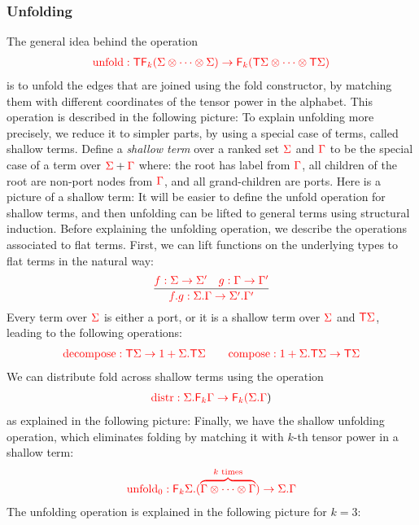 \subsubsection{Unfolding}
The general idea behind the  operation 
\begin{align*}
    {\color{red}{{\color{red}{\mathrm{unfold}}}: {\color{red}{\mathsf T}}{\color{red}{\mathsf F_{k}}}(\Sigma \otimes \cdots \otimes \Sigma) \to {\color{red}{\mathsf F_{k}}}( {\color{red}{\mathsf T}}{\color{red}{\Sigma}}\otimes \cdots \otimes {\color{red}{\mathsf T}}{\color{red}{\Sigma}})}} 
\end{align*}
is to unfold the edges that are joined using the fold constructor, by matching them with different coordinates of the tensor power in the alphabet. This operation is described in the following picture:
To explain unfolding more precisely, we reduce it to simpler parts, by using a special case of terms, called shallow terms. Define a \emph{shallow term} over a ranked set ${\color{red}{\Sigma}}$ and ${\color{red}{\Gamma}}$ to be the special case of  a term over ${\color{red}{\Sigma}} + {\color{red}{\Gamma}}$ where:  the root has label from ${\color{red}{\Gamma}}$, all children of the root are non-port nodes from ${\color{red}{\Gamma}}$, and all grand-children are ports. Here is a picture of a shallow term:
It will be easier to define the unfold operation for shallow terms, and then unfolding can be lifted to general terms using structural induction. 
Before explaining the unfolding operation, we describe  the operations associated to flat terms. First, we can lift functions on the underlying types to flat terms in the natural way:
\begin{align*}
    \frac
    { {\color{red}{f : \Sigma \to \Sigma'}} \quad {\color{red}{g : \Gamma \to \Gamma'}}}
    {{\color{red}{{\color{red}{f . g}} : {\color{red}{\Sigma . \Gamma}} \to {\color{red}{\Sigma' . \Gamma'}}}}}
\end{align*}
Every term over ${\color{red}{\Sigma}}$ is either a port, or it is a shallow term over ${\color{red}{\Sigma}}$ and ${\color{red}{\mathsf T}} {\color{red}{\Sigma}}$, leading to the following operations:
\begin{align*}
    {\color{red}{{\color{red}{\mathrm{decompose}}}: {\color{red}{\mathsf T}}\Sigma \to 1 +  
{\color{red}{\Sigma . {\color{red}{\mathsf T}}\Sigma}}}} \qquad  {\color{red}{{\color{red}{\mathrm{compose}}}: 1 +  
{\color{red}{\Sigma . {\color{red}{\mathsf T}}\Sigma}} \to {\color{red}{\mathsf T}}\Sigma }}
\end{align*}
We can distribute fold across shallow terms using the  operation
\begin{align*}
    {\color{red}{{\color{red}{\mathrm{distr}}}: {\color{red}{\Sigma . {\color{red}{\mathsf F_{k}}}\Gamma}} \to {\color{red}{\mathsf F_{k}}}({\color{red}{\Sigma . \Gamma}}}})
\end{align*}
as explained in the following picture:
Finally, we have the shallow unfolding operation, which eliminates folding   by matching it with $k$-th tensor power in a shallow term:
\begin{align*}
{\color{red}{
    {\color{red}{\mathrm{unfold}_0}}: {\color{red}{{\color{red}{\mathsf F_{k}}}\Sigma . (\overbrace{\Gamma \otimes \cdots \otimes \Gamma}^{\text{$k$ times}})}} \to {\color{red}{\Sigma . \Gamma}}
}}
\end{align*}
The unfolding operation is explained in the following picture for $k=3$:

